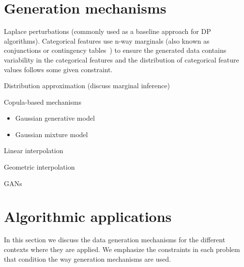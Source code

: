 \documentclass[parskip=full]{scrartcl}
\begin{document}
% 
% 
% 
% 

\section{Generation mechanisms}

Laplace perturbations (commonly used as a baseline approach for DP
algorithms). Categorical features use n-way marginals (also known as
conjunctions or contingency tables~\cite{gaboardi2014dual}) to ensure the generated data contains
variability in the categorical features and the distribution of categorical
feature values follows some given constraint.

Distribution approximation (discuss marginal inference)

Copula-based mechanisms

\begin{itemize}
    \item Gaussian generative model 
    \item Gaussian mixture model 
\end{itemize}

Linear interpolation

Geometric interpolation

GANs


\section{Algorithmic applications}\label{sec:algorithmic-applications}

In this section we discuss the data generation mechanisms for the different
contexts where they are applied. We emphasize the constraints in each problem
that condition the way generation mechanisms are used.
\end{document}
